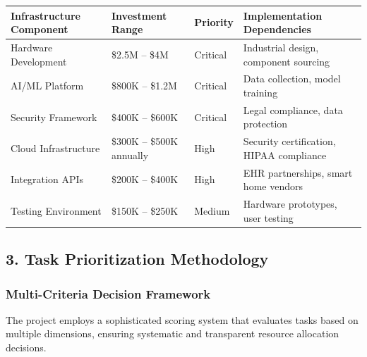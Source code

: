\documentclass[
  letterpaper,
  DIV=11,
  numbers=noendperiod]{scrartcl}
\begin{document}
\begin{longtable}[]{@{}
  >{\raggedright\arraybackslash}p{}
  >{\raggedright\arraybackslash}p{}
  >{\raggedright\arraybackslash}p{}
  >{\raggedright\arraybackslash}p{}@{}}
\toprule\noalign{}
\begin{minipage}[b]{\linewidth}\raggedright
Infrastructure Component
\end{minipage} & \begin{minipage}[b]{\linewidth}\raggedright
Investment Range
\end{minipage} & \begin{minipage}[b]{\linewidth}\raggedright
Priority
\end{minipage} & \begin{minipage}[b]{\linewidth}\raggedright
Implementation Dependencies
\end{minipage} \\
\midrule\noalign{}
\endhead
\bottomrule\noalign{}
\endlastfoot
Hardware Development & \$2.5M -- \$4M & Critical & Industrial design,
component sourcing \\
AI/ML Platform & \$800K -- \$1.2M & Critical & Data collection, model
training \\
Security Framework & \$400K -- \$600K & Critical & Legal compliance,
data protection \\
Cloud Infrastructure & \$300K -- \$500K annually & High & Security
certification, HIPAA compliance \\
Integration APIs & \$200K -- \$400K & High & EHR partnerships, smart
home vendors \\
Testing Environment & \$150K -- \$250K & Medium & Hardware prototypes,
user testing \\
\end{longtable}

\subsection{3. Task Prioritization
Methodology}\label{task-prioritization-methodology}

\subsubsection{Multi-Criteria Decision
Framework}\label{multi-criteria-decision-framework}

The project employs a sophisticated scoring system that evaluates tasks
based on multiple dimensions, ensuring systematic and transparent
resource allocation decisions.
\end{document}
